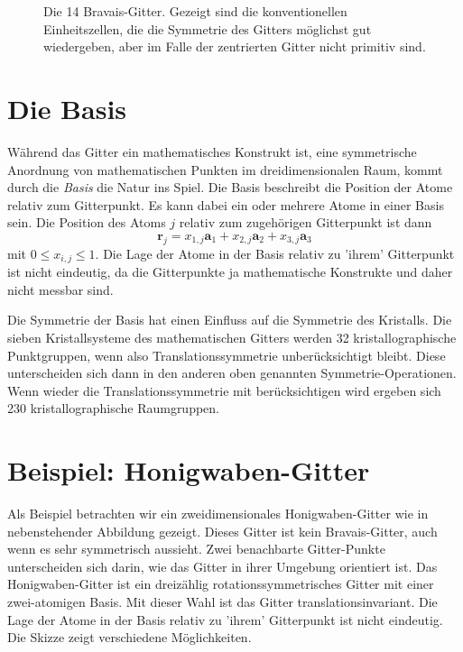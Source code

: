 \begin{figure}



\caption{Die 14 Bravais-Gitter. \label{fig:gitter_bravais14}  Gezeigt sind die konventionellen Einheitszellen, die die Symmetrie  des Gitters möglichst gut wiedergeben, aber im Falle der zentrierten Gitter nicht primitiv sind.
}
\end{figure}


\section{Die Basis}


Während das Gitter ein mathematisches Konstrukt ist, eine symmetrische Anordnung von mathematischen Punkten im dreidimensionalen Raum, kommt durch die \emph{Basis} die Natur ins Spiel. Die Basis beschreibt die Position der Atome relativ zum Gitterpunkt. Es kann dabei ein oder mehrere Atome in einer Basis sein. Die Position des Atoms $j$ relativ zum zugehörigen Gitterpunkt ist dann 
\begin{equation}
 \mathbf{r}_j = x_{1,j} \mathbf{a}_1 + x_{2,j} \mathbf{a}_2 + x_{3,j} \mathbf{a}_3  
\end{equation}
mit $0 \le x_{i,j} \le 1$. Die Lage der Atome in der Basis relativ zu 'ihrem' Gitterpunkt ist nicht eindeutig, da die Gitterpunkte ja mathematische Konstrukte und daher nicht messbar sind.


Die Symmetrie der Basis hat einen Einfluss auf die Symmetrie des Kristalls. Die sieben Kristallsysteme des mathematischen Gitters werden 32 kristallographische Punktgruppen, wenn also Translationssymmetrie unberücksichtigt bleibt. Diese unterscheiden sich dann in den anderen oben genannten Symmetrie-Operationen.
Wenn wieder die Translationssymmetrie mit berücksichtigen wird ergeben sich 230 kristallographische Raumgruppen.


\section{Beispiel: Honigwaben-Gitter}

Als Beispiel betrachten wir ein zweidimensionales Honigwaben-Gitter wie in nebenstehender Abbildung gezeigt. Dieses Gitter ist kein Bravais-Gitter, auch wenn es sehr symmetrisch aussieht. Zwei benachbarte Gitter-Punkte unterscheiden sich darin, wie das Gitter in ihrer Umgebung orientiert ist. Das  Honigwaben-Gitter ist ein dreizählig rotationssymmetrisches Gitter mit einer zwei-atomigen Basis. Mit dieser Wahl ist das Gitter translationsinvariant. Die Lage der Atome in der Basis relativ zu 'ihrem' Gitterpunkt ist nicht eindeutig. Die Skizze zeigt verschiedene Möglichkeiten.



